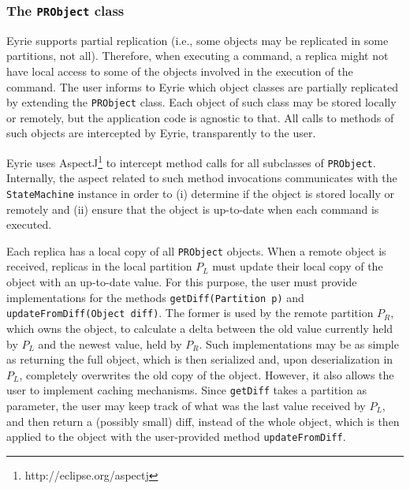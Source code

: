 \subsubsection{The \texttt{PRObject} class}

Eyrie supports partial replication (i.e., some objects may be replicated in some partitions, not all). 
Therefore, when executing a command, a replica might not have local access to some of the objects involved in the execution of the command. 
%
The user informs to Eyrie which object classes are partially replicated by extending the \verb#PRObject# class. Each object of such class may be stored locally or remotely, but the application code is agnostic to that. All calls to methods of such objects are intercepted by Eyrie, transparently to the user.


Eyrie uses AspectJ\footnote{http://eclipse.org/aspectj} to intercept method calls for all subclasses of \verb#PRObject#. 
Internally, the aspect related to such method invocations communicates with the \verb#StateMachine# instance in order to (i) determine if the object is stored locally or remotely and (ii) ensure that the object is up-to-date when each command is executed.

Each replica has a local copy of all \verb#PRObject# objects. 
When a remote object is received, replicas in the local partition $P_L$ must update their local copy of the object with an up-to-date value. 
For this purpose, the user must provide implementations for the methods \verb#getDiff(Partition p)# and \verb#updateFromDiff(Object diff)#. The former is used by the remote partition $P_R$, which owns the object, to calculate a delta between the old value currently held by $P_L$ and the newest value, held by $P_R$. Such implementations may be as simple as returning the full object, which is then serialized and, upon deserialization in $P_L$, completely overwrites the old copy of the object. However, it also allows the user to implement caching mechanisms. Since \verb#getDiff# takes a partition as parameter, the user may keep track of what was the last value received by $P_L$, and then return a (possibly small) diff, instead of the whole object, which is then applied to the object with the user-provided method \verb#updateFromDiff#.

